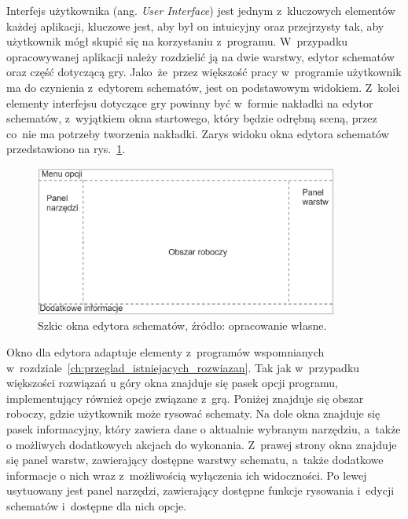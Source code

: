 Interfejs użytkownika (ang. \textit{User Interface}) jest jednym z~kluczowych elementów każdej aplikacji,
kluczowe jest, aby był on intuicyjny oraz przejrzysty tak,
aby użytkownik mógł skupić się na korzystaniu z~programu.
W~przypadku opracowywanej aplikacji należy rozdzielić ją na dwie warstwy,
edytor schematów oraz część dotyczącą gry.
Jako~że~przez większość pracy w~programie użytkownik ma do czynienia z~edytorem schematów,
jest on podstawowym widokiem.
Z~kolei elementy interfejsu dotyczące gry powinny być w~formie nakładki na edytor schematów,
z~wyjątkiem okna startowego, który będzie odrębną sceną, przez co~nie ma potrzeby tworzenia nakładki.
Zarys widoku okna edytora schematów przedstawiono na rys.~\ref{fig:editor}.

\begin{figure}[h]
    \centering
    \includegraphics[width=0.89\textwidth]{chapters/chapter3/rys/ui_projekt}
    \caption[Szkic okna edytora schematów]{Szkic okna edytora schematów, źródło: opracowanie własne.}
    \label{fig:editor}
\end{figure}

\indent Okno dla edytora adaptuje elementy
z~programów wspomnianych w~rozdziale~\ref{ch:przeglad_istniejacych_rozwiazan}.
Tak jak w~przypadku większości rozwiązań u góry okna znajduje się pasek opcji programu,
implementujący również opcje związane z~grą.
Poniżej znajduje się obszar roboczy, gdzie użytkownik może rysować schematy.
Na dole okna znajduje się pasek informacyjny, który zawiera dane o aktualnie wybranym narzędziu,
a~także o możliwych dodatkowych akcjach do wykonania.
Z~prawej strony okna znajduje się panel warstw, zawierający dostępne warstwy schematu,
a~także dodatkowe informacje o nich wraz z~możliwością wyłączenia ich widoczności.
Po lewej usytuowany jest panel narzędzi, zawierający dostępne funkcje rysowania i~edycji schematów
i~dostępne dla nich opcje.
